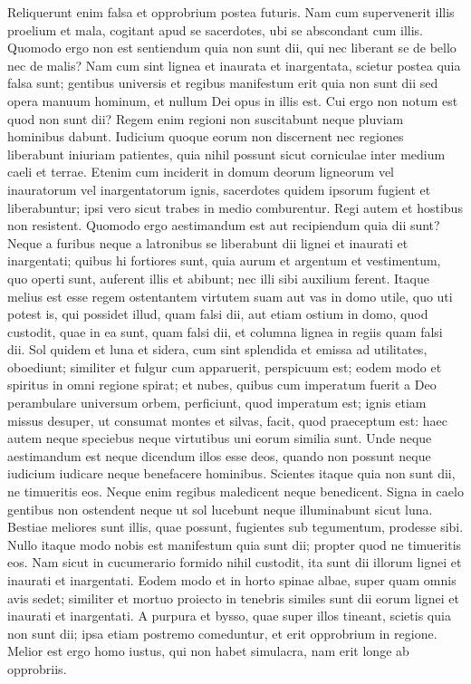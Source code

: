 \begin{biblechapter}
\verse Reliquerunt enim falsa et opprobrium postea futuris. 
\verse Nam cum supervenerit illis proelium et mala, cogitant apud se sacerdotes, ubi se abscondant cum illis. 
\verse Quomodo ergo non est sentiendum quia non sunt dii, qui nec liberant se de bello nec de malis? 
\verse Nam cum sint lignea et inaurata et inargentata, scietur postea quia falsa sunt; gentibus universis et regibus manifestum erit quia non sunt dii sed opera manuum hominum, et nullum Dei opus in illis est. 
\verse Cui ergo non notum est quod non sunt dii? 
\verse Regem enim regioni non suscitabunt neque pluviam hominibus dabunt. 
\verse Iudicium quoque eorum non discernent nec regiones liberabunt iniuriam patientes, quia nihil possunt sicut corniculae inter medium caeli et terrae. 
\verse Etenim cum inciderit in domum deorum ligneorum vel inauratorum vel inargentatorum ignis, sacerdotes quidem ipsorum fugient et liberabuntur; ipsi vero sicut trabes in medio comburentur. 
\verse Regi autem et hostibus non resistent. Quomodo ergo aestimandum est aut recipiendum quia dii sunt? 
\verse Neque a furibus neque a latronibus se liberabunt dii lignei et inaurati et inargentati; 
\verse quibus hi fortiores sunt, quia aurum et argentum et vestimentum, quo operti sunt, auferent illis et abibunt; nec illi sibi auxilium ferent. 
\verse Itaque melius est esse regem ostentantem virtutem suam aut vas in domo utile, quo uti potest is, qui possidet illud, quam falsi dii, aut etiam ostium in domo, quod custodit, quae in ea sunt, quam falsi dii, et columna lignea in regiis quam falsi dii. 
\verse Sol quidem et luna et sidera, cum sint splendida et emissa ad utilitates, oboediunt; 
\verse similiter et fulgur cum apparuerit, perspicuum est; eodem modo et spiritus in omni regione spirat;  
\verse et nubes, quibus cum imperatum fuerit a Deo perambulare universum orbem, perficiunt, quod imperatum est; 
\verse ignis etiam missus desuper, ut consumat montes et silvas, facit, quod praeceptum est: haec autem neque speciebus neque virtutibus uni eorum similia sunt. 
\verse Unde neque aestimandum est neque dicendum illos esse deos, quando non possunt neque iudicium iudicare neque benefacere hominibus. 
\verse Scientes itaque quia non sunt dii, ne timueritis eos. 
\verse Neque enim regibus maledicent neque benedicent. 
\verse Signa in caelo gentibus non ostendent neque ut sol lucebunt neque illuminabunt sicut luna.  
\verse Bestiae meliores sunt illis, quae possunt, fugientes sub tegumentum, prodesse sibi. 
\verse Nullo itaque modo nobis est manifestum quia sunt dii; propter quod ne timueritis eos. 
\verse Nam sicut in cucumerario formido nihil custodit, ita sunt dii illorum lignei et inaurati et inargentati. 
\verse Eodem modo et in horto spinae albae, super quam omnis avis sedet; similiter et mortuo proiecto in tenebris similes sunt dii eorum lignei et inaurati et inargentati. 
\verse A purpura et bysso, quae super illos tineant, scietis quia non sunt dii; ipsa etiam postremo comeduntur, et erit opprobrium in regione. 
\verse Melior est ergo homo iustus, qui non habet simulacra, nam erit longe ab opprobriis.    
\end{biblechapter}
